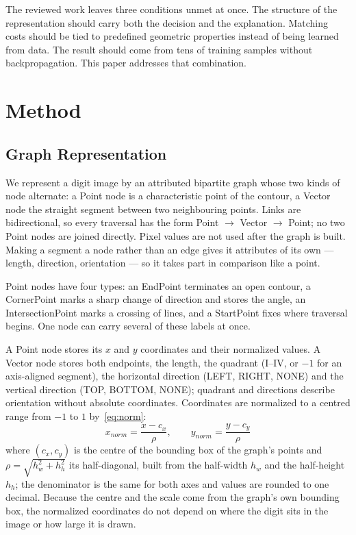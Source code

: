 The reviewed work leaves three conditions unmet at once. The structure of the representation should carry both the decision and the explanation. Matching costs should be tied to predefined geometric properties instead of being learned from data. The result should come from tens of training samples without backpropagation. This paper addresses that combination.

\section{Method}

\subsection{Graph Representation}

We represent a digit image by an attributed bipartite graph whose two kinds of node alternate: a Point node is a characteristic point of the contour, a Vector node the straight segment between two neighbouring points. Links are bidirectional, so every traversal has the form Point $\rightarrow$ Vector $\rightarrow$ Point; no two Point nodes are joined directly. Pixel values are not used after the graph is built. Making a segment a node rather than an edge gives it attributes of its own --- length, direction, orientation --- so it takes part in comparison like a point.

Point nodes have four types: an EndPoint terminates an open contour, a CornerPoint marks a sharp change of direction and stores the angle, an IntersectionPoint marks a crossing of lines, and a StartPoint fixes where traversal begins. One node can carry several of these labels at once.

A Point node stores its $x$ and $y$ coordinates and their normalized values. A Vector node stores both endpoints, the length, the quadrant (I--IV, or $-1$ for an axis-aligned segment), the horizontal direction (LEFT, RIGHT, NONE) and the vertical direction (TOP, BOTTOM, NONE); quadrant and directions describe orientation without absolute coordinates. Coordinates are normalized to a centred range from $-1$ to $1$ by~\eqref{eq:norm}:
\begin{equation}\label{eq:norm}
x_{norm} = \frac{x - c_x}{\rho}, \qquad y_{norm} = \frac{y - c_y}{\rho}
\end{equation}
where $(c_x, c_y)$ is the centre of the bounding box of the graph's points and $\rho = \sqrt{h_w^2 + h_h^2}$ its half-diagonal, built from the half-width $h_w$ and the half-height $h_h$; the denominator is the same for both axes and values are rounded to one decimal. Because the centre and the scale come from the graph's own bounding box, the normalized coordinates do not depend on where the digit sits in the image or how large it is drawn.

